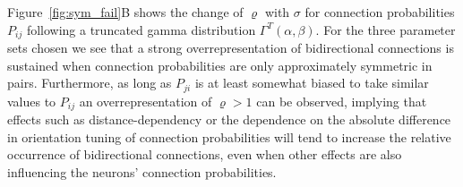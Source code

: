 Figure~\ref{fig:sym_fail}B shows the change of $\varrho$ with $\sigma$ for connection probabilities $P_{ij}$ following a truncated gamma distribution $\Gamma^T(\alpha, \beta)$. For the three parameter sets chosen we see that a strong overrepresentation of bidirectional connections is sustained when connection probabilities are only approximately symmetric in pairs. Furthermore, as long as $P_{ji}$ is at least somewhat biased to take similar values to $P_{ij}$ an overrepresentation of $\varrho > 1$ can be observed, implying that effects such as distance-dependency or the dependence on the absolute difference in orientation tuning of connection probabilities will tend to increase the relative occurrence of bidirectional connections, even when other effects are also influencing the neurons' connection probabilities.


%

